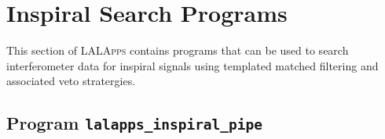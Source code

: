 
\clearpage

\section{Inspiral Search Programs}
\label{section:inspiral}

This section of \textsc{LALApps} contains programs that can be used to search
interferometer data for inspiral signals using templated matched filtering and
associated veto stratergies.

\clearpage
\subsection{Program \texttt{lalapps\_inspiral\_pipe}}
\label{program:inspiral-pipeline}


